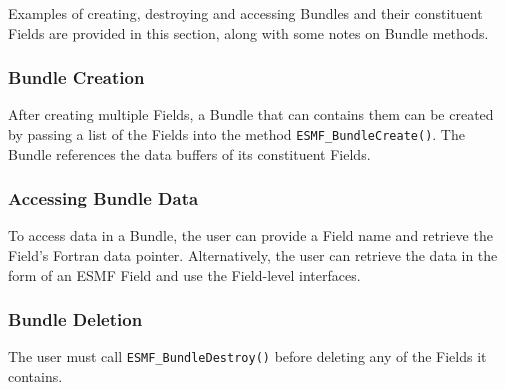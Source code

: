 

Examples of creating, destroying and accessing Bundles and their
constituent Fields are provided in this section, along with some
notes on Bundle methods.

\subsubsection{Bundle Creation}

After creating multiple Fields, a Bundle that can contains them 
can be created by passing a list of the Fields into the 
method {\tt ESMF\_BundleCreate()}.  The Bundle references the 
data buffers of its constituent Fields.  

\subsubsection{Accessing Bundle Data}

To access data in a Bundle, the user can provide a Field
name and retrieve the Field's Fortran data pointer.  Alternatively,
the user can retrieve the data in the form of an ESMF 
Field and use the Field-level interfaces.

\subsubsection{Bundle Deletion}

The user must call {\tt ESMF\_BundleDestroy()} before 
deleting any of the Fields it contains.


